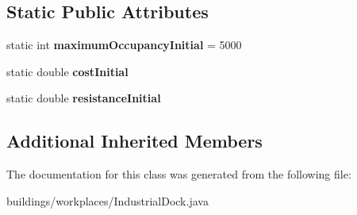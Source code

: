 \subsection*{Static Public Attributes}
\begin{DoxyCompactItemize}
\item 
static int {\bfseries maximum\+Occupancy\+Initial} = 5000\hypertarget{classbuildings_1_1workplaces_1_1_industrial_dock_a4c98d6726eb20a85ec739dbe2d1c7a87}{}\label{classbuildings_1_1workplaces_1_1_industrial_dock_a4c98d6726eb20a85ec739dbe2d1c7a87}

\item 
static double {\bfseries cost\+Initial}\hypertarget{classbuildings_1_1workplaces_1_1_industrial_dock_a73951901b2084f30881fa76883ee80a3}{}\label{classbuildings_1_1workplaces_1_1_industrial_dock_a73951901b2084f30881fa76883ee80a3}

\item 
static double {\bfseries resistance\+Initial}\hypertarget{classbuildings_1_1workplaces_1_1_industrial_dock_af7dee49ec9367e54ea906d1155bee69f}{}\label{classbuildings_1_1workplaces_1_1_industrial_dock_af7dee49ec9367e54ea906d1155bee69f}

\end{DoxyCompactItemize}
\subsection*{Additional Inherited Members}


The documentation for this class was generated from the following file\+:\begin{DoxyCompactItemize}
\item 
buildings/workplaces/Industrial\+Dock.\+java\end{DoxyCompactItemize}
